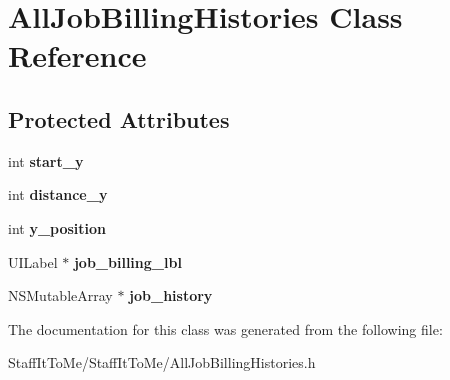 \hypertarget{interface_all_job_billing_histories}{
\section{\-All\-Job\-Billing\-Histories \-Class \-Reference}
\label{interface_all_job_billing_histories}
}
\subsection*{\-Protected \-Attributes}
\begin{DoxyCompactItemize}
\item 
\hypertarget{interface_all_job_billing_histories_ace915346b2ec8743277a35ac2c6a19b8}{
int {\bfseries start\-\_\-y}}
\label{interface_all_job_billing_histories_ace915346b2ec8743277a35ac2c6a19b8}

\item 
\hypertarget{interface_all_job_billing_histories_a0ae8034e207486f009b6728de0c84813}{
int {\bfseries distance\-\_\-y}}
\label{interface_all_job_billing_histories_a0ae8034e207486f009b6728de0c84813}

\item 
\hypertarget{interface_all_job_billing_histories_aedef2d2a7f90add37b68a1dc03c5fab5}{
int {\bfseries y\-\_\-position}}
\label{interface_all_job_billing_histories_aedef2d2a7f90add37b68a1dc03c5fab5}

\item 
\hypertarget{interface_all_job_billing_histories_a15608a208ab7f72d89a3f37e22209abd}{
\-U\-I\-Label $\ast$ {\bfseries job\-\_\-billing\-\_\-lbl}}
\label{interface_all_job_billing_histories_a15608a208ab7f72d89a3f37e22209abd}

\item 
\hypertarget{interface_all_job_billing_histories_a46ef3e15aa7d9ec9e52acab0eab70f09}{
\-N\-S\-Mutable\-Array $\ast$ {\bfseries job\-\_\-history}}
\label{interface_all_job_billing_histories_a46ef3e15aa7d9ec9e52acab0eab70f09}

\end{DoxyCompactItemize}


\-The documentation for this class was generated from the following file\-:\begin{DoxyCompactItemize}
\item 
\-Staff\-It\-To\-Me/\-Staff\-It\-To\-Me/\-All\-Job\-Billing\-Histories.\-h\end{DoxyCompactItemize}
